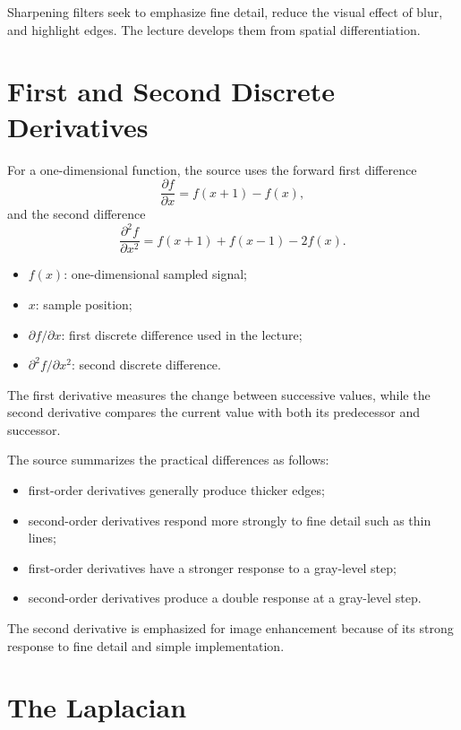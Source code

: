 \documentclass[11pt,a4paper,oneside]{report}
\newcommand{\mathlegend}[1]{%
  \par\vspace{0.2em}{\small\itshape where}\par
  \begin{itemize}[leftmargin=1.7em,topsep=0.15em,itemsep=0.12em]
  #1
  \end{itemize}
}
\begin{document}
Sharpening filters seek to emphasize fine detail, reduce the visual effect of blur, and highlight edges. The lecture develops them from spatial differentiation.

\section{First and Second Discrete Derivatives}

For a one-dimensional function, the source uses the forward first difference
\begin{equation}
  \frac{\partial f}{\partial x}=f(x+1)-f(x),
  \label{eq:first-difference}
\end{equation}
and the second difference
\begin{equation}
  \frac{\partial^2f}{\partial x^2}=f(x+1)+f(x-1)-2f(x).
  \label{eq:second-difference}
\end{equation}
\mathlegend{
  \item $f(x)$: one-dimensional sampled signal;
  \item $x$: sample position;
  \item $\partial f/\partial x$: first discrete difference used in the lecture;
  \item $\partial^2f/\partial x^2$: second discrete difference.
}
The first derivative measures the change between successive values, while the second derivative compares the current value with both its predecessor and successor.



The source summarizes the practical differences as follows:
\begin{itemize}
  \item first-order derivatives generally produce thicker edges;
  \item second-order derivatives respond more strongly to fine detail such as thin lines;
  \item first-order derivatives have a stronger response to a gray-level step;
  \item second-order derivatives produce a double response at a gray-level step.
\end{itemize}
The second derivative is emphasized for image enhancement because of its strong response to fine detail and simple implementation.

\section{The Laplacian}
\end{document}
